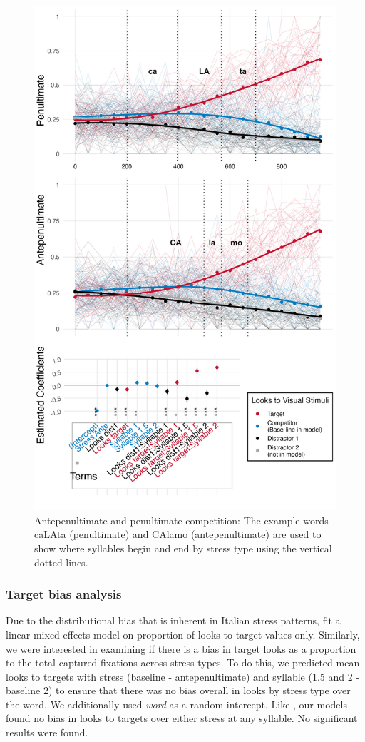 \begin{figure}[H]
  \centering
  \includegraphics[width=0.6\linewidth]{visuals/pen_vs_anti_pen_id_combo.jpeg} %
  \caption{Antepenultimate and penultimate competition: The example words caLAta (penultimate) and CAlamo (antepenultimate) are used to show where syllables begin and end by stress type using the vertical dotted lines.}
  \label{fig:raw_pen_vs_anti}
\end{figure}

\subsubsection{Target bias analysis}

Due to the distributional bias that is inherent in Italian stress patterns, \cite{Sulpizio_McQueen_2012} fit a linear mixed-effects model on proportion of looks to target values only. Similarly, we were interested in examining if there is a bias in target looks as a proportion to the total captured fixations across stress types. To do this, we predicted mean looks to targets with stress (baseline - antepenultimate) and syllable (1.5 and 2 - baseline 2) to ensure that there was no bias overall in looks by stress type over the word. We additionally used \textit{word} as a random intercept. Like \cite{Sulpizio_McQueen_2012}, our models found no bias in looks to targets over either stress at any syllable. No significant results were found.   


